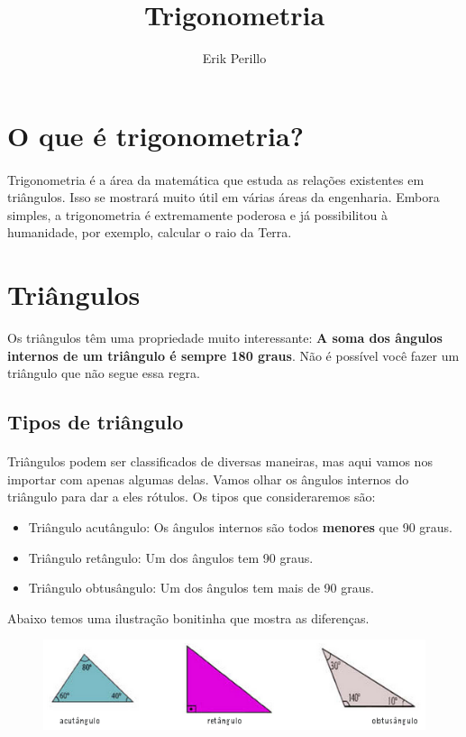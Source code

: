 \documentclass[11pt]{article}
\begin{document}
\title{Trigonometria}
\author{Erik Perillo}
\date{}
\maketitle

\newpage

\tableofcontents

\newpage

\section{O que é trigonometria?}
\paragraph{}
Trigonometria é a área da matemática que estuda as relações existentes em 
triângulos. Isso se mostrará muito útil em várias áreas da engenharia.
Embora simples, a trigonometria é extremamente poderosa e já possibilitou 
à humanidade, por exemplo, calcular o raio da Terra.

\section{Triângulos}
Os triângulos têm uma propriedade muito interessante:
\textbf{A soma dos ângulos internos de um triângulo é sempre 180 graus}.
Não é possível você fazer um triângulo que não segue essa regra.

\subsection{Tipos de triângulo}
\paragraph{}
Triângulos podem ser classificados de diversas maneiras, mas aqui vamos nos
importar com apenas algumas delas. Vamos olhar os ângulos internos do triângulo
para dar a eles rótulos. Os tipos que consideraremos são:
\begin{itemize}
	\item Triângulo acutângulo: Os ângulos internos são todos \textbf{menores}
		que 90 graus.
	\item Triângulo retângulo: Um dos ângulos tem 90 graus.
	\item Triângulo obtusângulo: Um dos ângulos tem mais de 90 graus.
\end{itemize}

Abaixo temos uma ilustração bonitinha que mostra as diferenças.
\begin{figure}[H]
	\centering
	\includegraphics[width=1.0\linewidth]{imgs/tipos_triangulos.png}
\end{figure}
\end{document}
